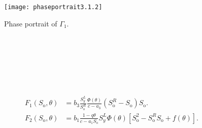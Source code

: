 \documentclass[
    8pt,
    aspectratio=1610,
    c,
    intlimits,
    leqno,
    professionalfonts,
]{beamer}
\begin{document}
\begin{frame}
	\begin{figure}[ht!]
		\centering
		\texttt{[image: phaseportrait3.1.2]}
		\caption{Phase portrait of $\Gamma_{1}$.}
	\end{figure}
\end{frame}

\begin{frame}[fragile]
	\frametitle{\secname}

	\begin{columns}
		\begin{column}{0.43\textwidth}
			\inputminted[fontsize=\tiny,firstline=5,lastline=35]{python}{main.py}
			\inputminted[fontsize=\tiny,firstline=45,lastline=56]{python}{main.py}
		\end{column}
		\begin{column}{0.53\textwidth}
			\inputminted[fontsize=\tiny,firstline=1,lastline=27]{text}{main.txt}
		\end{column}
	\end{columns}
\end{frame}

\begin{frame}[fragile]
	\frametitle{\secname}

	\begin{columns}
		\begin{column}{0.43\textwidth}
			\inputminted[fontsize=\tiny,firstline=67,lastline=107]{python}{main.py}
		\end{column}
		\begin{column}{0.53\textwidth}
			\inputminted[fontsize=\tiny,firstline=29,lastline=63]{text}{main.txt}
		\end{column}
	\end{columns}
\end{frame}

\begin{frame}
	\begin{align*}
		F_{1}\left(S_{\text{o}},\theta\right) & =
		b_{3}
		\frac{S^{L}_{y}}{S^{R}_{\text{o}}}
		\frac{\Phi\left(\theta\right)}{c-a_{3}}\left(S^{R}_{\text{o}}-S_{\text{o}}\right)S_{\text{o}}. \\
		F_{2}\left(S_{\text{o}},\theta\right) & =
		b_{1}\frac{1-q\theta}{c-a_{1}S_{\text{o}}}
		S^{L}_{y}\Phi\left(\theta\right)
		\left[S^{2}_{\text{o}}-S^{R}_{\text{o}}S_{\text{o}}+f\left(\theta\right)\right].
	\end{align*}
\end{frame}
\end{document}

